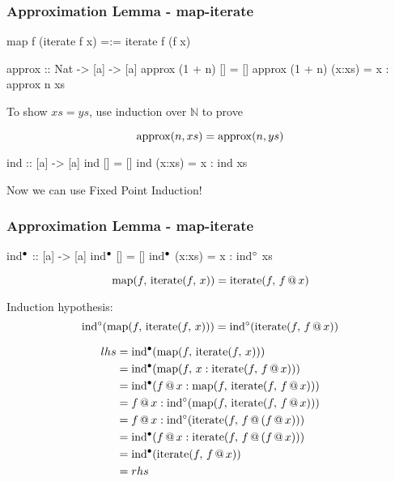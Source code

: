 \documentclass[serif,professionalfont]{beamer}
\begin{document}
\begin{frame}[fragile]
\frametitle{Approximation Lemma - map-iterate}

\pause

\begin{code}
map f (iterate f x) =:= iterate f (f x)
\end{code}

\begin{code}
approx :: Nat -> [a] -> [a]
approx (1 + n) []     = []
approx (1 + n) (x:xs) = x : approx n xs
\end{code}

\pause

To show $xs = ys$, use induction over $\mathbb{N}$ to prove

$$\fa{n}\fn{approx}(n,xs) = \fn{approx}(n,ys)$$

\pause

\begin{code}
ind :: [a] -> [a]
ind []     = []
ind (x:xs) = x : ind xs
\end{code}

Now we can use Fixed Point Induction!

\end{frame}

\newcommand\iter[2]{\fn{iterate}(#1,\,#2)}
\newcommand\map[2]{\fn{map}(#1,\,#2)}
\newcommand\appw[1]{\fn{\unfix{ind}}(#1)}
\newcommand\appb[1]{\fn{\tofix{ind}}(#1)}

\begin{frame}[fragile]
\frametitle{Approximation Lemma - map-iterate}

\small{
\begin{code}[mathescape]
ind$\fixb$ :: [a] -> [a]
ind$\fixb$ []     = []
ind$\fixb$ (x:xs) = x : ind$\fixw$ xs
\end{code}
}

$$\map{f}{\iter{f}{x}} = \iter{f}{\app{f}{x}}$$

\pause

Induction hypothesis:
$$\appw{\map{f}{\iter{f}{x}}} = \appw{\iter{f}{\app{f}{x}}}$$

\pause

\begin{align*}
lhs = & \; \appb{\map{f}{\iter{f}{x}}} \\
    = & \; \appb{\map{f}{x:\iter{f}{\app{f}{x}}}}\\
    = & \; \appb{\app{f}{x} : \map{f}{\iter{f}{\app{f}{x}}}}\\
    = & \; \app{f}{x} : \appw{\map{f}{\iter{f}{\app{f}{x}}}}\\
    = & \; \app{f}{x} : \appw{\iter{f}{\app{f}{(\app{f}{x})}}}\\
    = & \; \appb{\app{f}{x} : \iter{f}{\app{f}{(\app{f}{x})}}}\\
    = & \; \appb{\iter{f}{\app{f}{x}}} \\
    = & \; rhs
\end{align*}

\end{frame}
\end{document}
